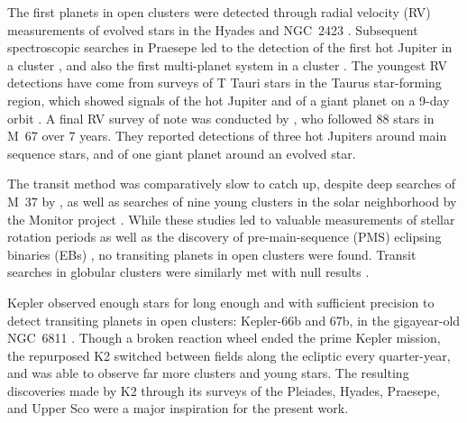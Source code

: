 \documentclass[12pt,twocolumn,tighten]{aastex62}
\begin{document}
The first planets in open clusters were detected through radial
velocity (RV) measurements of evolved stars in the Hyades
and NGC~2423 \citep{Sato_et_al_2007,lovis_mayor_2007}.
Subsequent spectroscopic searches in Praesepe led to the detection of
the first hot Jupiter in a cluster \citep{Quinn_et_al_2012}, and also
the first multi-planet system in a cluster \citep{Malavolta_et_al_2016}.
The youngest RV detections have come from surveys of T Tauri stars in the
Taurus star-forming region, which showed signals of the hot Jupiter
\citep[V830~Tau~b][]{donati_hj_2016} and of a giant planet on a 9-day orbit
\citep[CI~Tau~b][]{johns-krull_candidate_2016,flagg_co_2019}.
A final RV survey of note was conducted by
\citet{brucalassi_search_2017}, who followed 88 stars in M~67 over 7
years.  They reported detections of three hot Jupiters around main
sequence stars, and of one giant planet around an evolved star.

The transit method was comparatively slow to catch up, despite deep
searches of M~37 by \citet{hartman_MMT_IV_2009}, as well as searches
of nine young clusters in the solar neighborhood by the Monitor
project
\citep{aigrain_monitor_2007,irwin_monitordata_2007,miller_monitor_2008}.
While these studies led to valuable measurements of stellar rotation
periods \citep{hartman_rotation_2009,Irwin_NGC2516_2007} as well as
the discovery of pre-main-sequence (PMS) eclipsing binaries (EBs)
\citep{irwin_monitor_PMSEB_2007}, no transiting planets in open
clusters were found.  Transit searches in globular clusters were
similarly met with null results \citep{gilliland_lack_2000,
weldrake_searching_2006}.

Kepler \citep{borucki_kepler_2010} observed enough stars for long
enough and with sufficient precision to detect transiting planets in
open clusters:  Kepler-66b and 67b, in the gigayear-old NGC~6811
\citep{Meibom_et_al_2013}.  Though a broken reaction wheel ended the
prime Kepler mission, the repurposed K2 \citep{howell_k2_2014}
switched between fields along the ecliptic every quarter-year, and was
able to observe far more clusters and young stars.  The resulting
discoveries made by K2 through its surveys of the Pleiades, Hyades,
Praesepe, and Upper Sco were a major inspiration for the present work.
\end{document}
